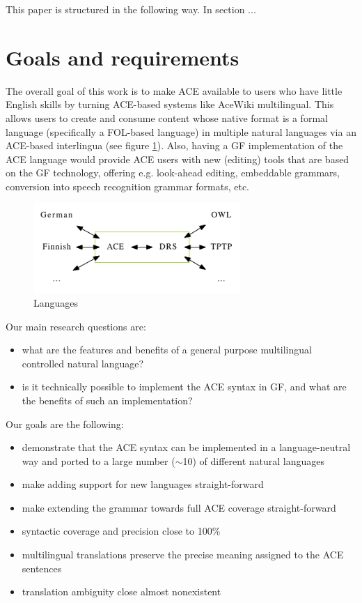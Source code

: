 \documentclass[a4paper]{article}
\begin{document}
This paper is structured in the following way. In section ...

\section{Goals and requirements}

The overall goal of this work is to make ACE available to users who have little
English skills by turning ACE-based systems like
AceWiki \cite{kuhn2010doctoralthesis} multilingual. This allows users
to create and consume content whose native format is a formal language
(specifically a FOL-based language) in multiple natural languages
via an ACE-based interlingua (see figure \ref{fig:languages}).
Also, having a GF implementation of the ACE language would
provide ACE users with new (editing) tools that are based on the GF technology,
offering e.g. look-ahead editing, embeddable grammars, conversion into
speech recognition grammar formats, etc.

\begin{figure}[ht]
\centering
\includegraphics[width=0.7\textwidth]{languages}
\caption[Languages]
{Languages}
\label{fig:languages}
\end{figure}

Our main research questions are:

\begin{itemize}
\item what are the features and benefits of a general purpose multilingual
controlled natural language?
\item is it technically possible to implement the ACE syntax in GF,
and what are the benefits of such an implementation?
\end{itemize}

Our goals are the following:

\begin{itemize}
\item demonstrate that the ACE syntax can be implemented in a language-neutral
way and ported to a large number ($\sim$10) of different natural languages
\item make adding support for new languages straight-forward
\item make extending the grammar towards full ACE coverage straight-forward
\item syntactic coverage and precision close to 100\%
\item multilingual translations preserve the precise
meaning assigned to the ACE sentences
\item translation ambiguity close almost nonexistent
\end{itemize}
\end{document}
